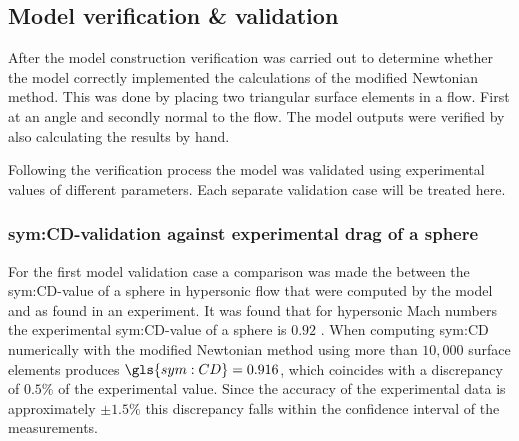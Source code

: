\subsection{Model verification \& validation}
\label{subsec:aeroverval}
After the model construction verification was carried out to determine whether the model correctly implemented the calculations of the modified Newtonian method. This was done by placing two triangular surface elements in a flow. First at an angle and secondly normal to the flow. The model outputs were verified by also calculating the results by hand.

Following the verification process the model was validated using experimental values of different parameters. Each separate validation case will be treated here.

\subsubsection{\gls{sym:CD}-validation against experimental drag of a sphere}
\label{subsubsec:valsphere}
For the first model validation case a comparison was made the between the \gls{sym:CD}-value of a sphere in hypersonic flow that were computed by the model and as found in an experiment. It was found that for hypersonic Mach numbers the experimental \gls{sym:CD}-value of a sphere is $0.92$ \cite{Bailey1966,AndersonJr.2007,Cox1965}. When computing \gls{sym:CD} numerically with the modified Newtonian method using more than $10,000$ surface elements produces $\gls{sym:CD}=0.916$, which coincides with a discrepancy of $0.5\%$ of the experimental value. Since the accuracy of the experimental data is approximately $\pm1.5\%$ \cite{Bailey1966} this discrepancy falls within the confidence interval of the measurements.

